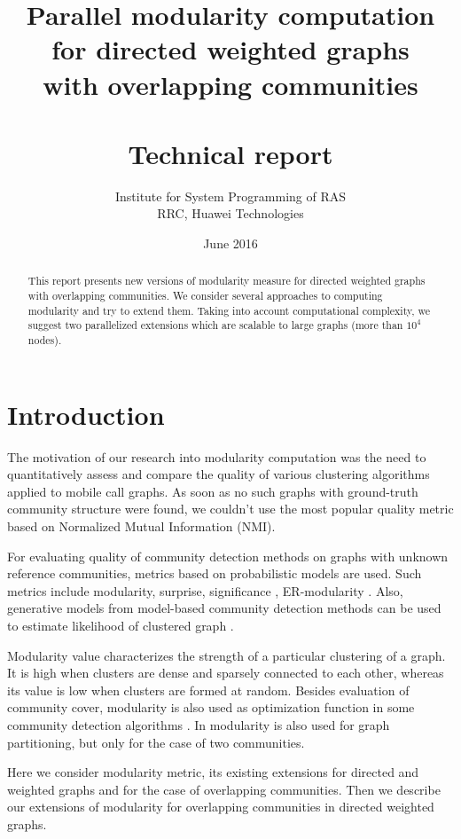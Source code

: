 \documentclass[a4paper,twocolumn]{article}
\title{Parallel modularity computation for directed weighted graphs \\ with overlapping communities \\ \bigskip \\ \large Technical report}
\author{Institute for System Programming of RAS \\ RRC, Huawei Technologies}
\date{June 2016}
\begin{document}
\maketitle

\begin{abstract}
This report presents new versions of modularity measure for directed weighted graphs with overlapping communities. We consider several approaches to computing modularity and try to extend them. Taking into account computational complexity, we suggest two parallelized extensions which are scalable to large graphs (more than $10^4$ nodes). %
\end{abstract}

\section{Introduction}

The motivation of our research into modularity computation was the need to quantitatively assess and compare the quality of various clustering algorithms applied to mobile call graphs. As soon as no such graphs with ground-truth community structure were found, we couldn't use the most popular quality metric based on Normalized Mutual Information (NMI).

For evaluating quality of community detection methods on graphs with unknown reference communities, metrics based on probabilistic models are used. Such metrics include modularity, surprise, significance \cite{traag2015surprise}, ER-modularity \cite{reichardt2006}. Also, generative models from model-based community detection methods can be used to estimate likelihood of clustered graph \cite{Yang2012, McDaid2010}.

Modularity value characterizes the strength of a particular clustering of a graph. It is high when clusters are dense and sparsely connected to each other, whereas its value is low when clusters are formed at random. Besides evaluation of community cover, modularity is also used as optimization function in some community detection algorithms \cite{Chen2014, Dugue2015}. In \cite{Chang2011} modularity is also used for graph partitioning, but only for the case of two communities.

Here we consider modularity metric, its existing extensions for directed and weighted graphs and for the case of overlapping communities. Then we describe our extensions of modularity for overlapping communities in directed weighted graphs.
\end{document}
